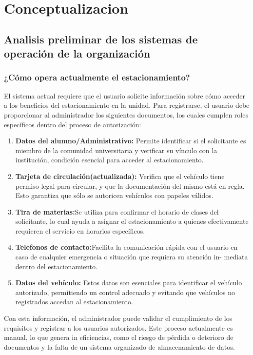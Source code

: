 \newpage
{
	\justifying
\section{Conceptualizacion}
\subsection{Analisis preliminar de los sistemas de operación de la organización}
\subsubsection{¿Cómo opera actualmente el estacionamiento?}
El sistema actual requiere que el usuario solicite información sobre cómo acceder 
a los beneficios del estacionamiento en la unidad. Para registrarse, el
usuario debe proporcionar al administrador los siguientes documentos, los cuales
cumplen roles específicos dentro del proceso de autorización:
\begin{enumerate}
\item{\textbf{Datos del alumno/Administrativo:}  Permite identificar si el solicitante
	es miembro de la comunidad universitaria y verificar su vínculo con la
	institución, condición esencial para acceder al estacionamiento.}
\item{\textbf{Tarjeta de circulación(actualizada):} Verifica que el vehículo tiene
	permiso legal para circular, y que la documentación del mismo está en
	regla. Esto garantiza que sólo se autoricen vehículos con papeles válidos.}
\item {\textbf{Tira de materias:}Se utiliza para confirmar el horario de clases del solicitante, lo cual
	 ayuda a asignar el estacionamiento a quienes efectivamente
	requieren el servicio en horarios específicos. }
\item{\textbf{Telefonos de contacto:}Facilita la comunicación rápida con el usuario
	en caso de cualquier emergencia o situación que requiera su atención in-
	mediata dentro del estacionamiento.}
\item{\textbf{Datos del vehículo:} Estos datos son esenciales para identificar el vehículo 
	autorizado, permitiendo un control adecuado y evitando que vehículos 
	no registrados accedan al estacionamiento.  }
\end{enumerate}
Con esta información, el administrador puede validar el cumplimiento de los
requisitos y registrar a los usuarios autorizados. Este proceso actualmente es
manual, lo que genera in eficiencias, como el riesgo de pérdida o deterioro de
documentos y la falta de un sistema organizado de almacenamiento de datos.
}
